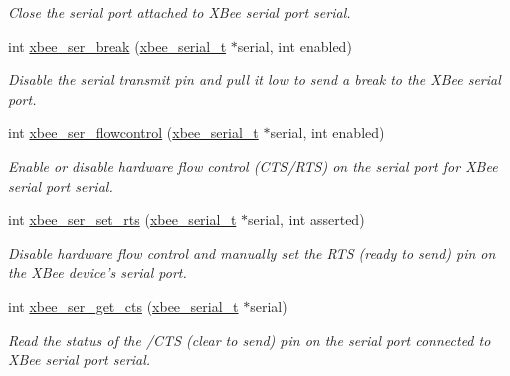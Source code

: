 \begin{DoxyCompactItemize}
\begin{DoxyCompactList}\small\item\em Close the serial port attached to X\-Bee serial port {\itshape serial}. \end{DoxyCompactList}\item 
int \hyperlink{group__hal__posix_ga6ae89792415a7ac8b45b56188eb9eeb4}{xbee\-\_\-ser\-\_\-break} (\hyperlink{structxbee__serial__t}{xbee\-\_\-serial\-\_\-t} $\ast$serial, int enabled)
\begin{DoxyCompactList}\small\item\em Disable the serial transmit pin and pull it low to send a break to the X\-Bee serial port. \end{DoxyCompactList}\item 
int \hyperlink{group__hal__posix_ga1f5f72ffdfbfb45ac523640db32296ff}{xbee\-\_\-ser\-\_\-flowcontrol} (\hyperlink{structxbee__serial__t}{xbee\-\_\-serial\-\_\-t} $\ast$serial, int enabled)
\begin{DoxyCompactList}\small\item\em Enable or disable hardware flow control (C\-T\-S/\-R\-T\-S) on the serial port for X\-Bee serial port {\itshape serial}. \end{DoxyCompactList}\item 
int \hyperlink{group__hal__posix_ga731188d8cf41d3d749bc84d51b672535}{xbee\-\_\-ser\-\_\-set\-\_\-rts} (\hyperlink{structxbee__serial__t}{xbee\-\_\-serial\-\_\-t} $\ast$serial, int asserted)
\begin{DoxyCompactList}\small\item\em Disable hardware flow control and manually set the R\-T\-S (ready to send) pin on the X\-Bee device's serial port. \end{DoxyCompactList}\item 
int \hyperlink{group__hal__posix_ga894f6fadc890b5ba5ce32338f0acd217}{xbee\-\_\-ser\-\_\-get\-\_\-cts} (\hyperlink{structxbee__serial__t}{xbee\-\_\-serial\-\_\-t} $\ast$serial)
\begin{DoxyCompactList}\small\item\em Read the status of the /\-C\-T\-S (clear to send) pin on the serial port connected to X\-Bee serial port {\itshape serial}. \end{DoxyCompactList}\end{DoxyCompactItemize}
